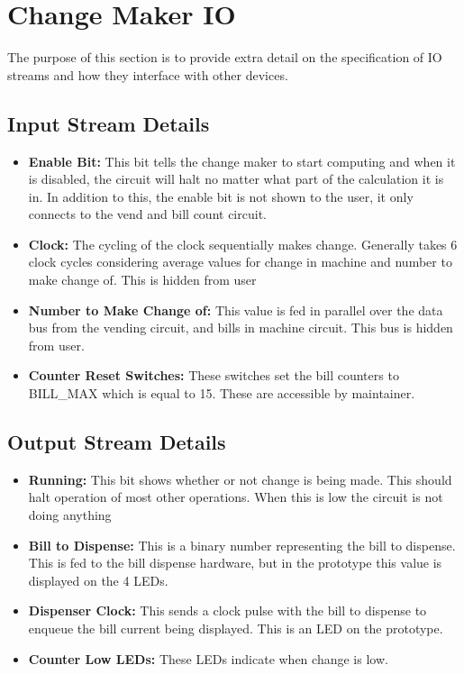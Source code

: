 \section{Change Maker IO}
The purpose of this section is to provide extra detail on
the specification of IO streams and how they interface
with other devices. 

\subsection{Input Stream Details}
\begin{itemize}
\item{\textbf{Enable Bit:} This bit tells the change maker to start computing
and when it is disabled, the circuit will halt no matter what part of
the calculation it is in. In addition to this, the enable bit is not
shown to the user, it only connects to the vend and bill count circuit.}
\item{\textbf{Clock:} The cycling of the clock sequentially makes change. 
Generally takes 6 clock cycles considering average values for change in 
machine and number to make change of. This is hidden from user}
\item{\textbf{Number to Make Change of:} This value is fed in parallel over the
data bus from the vending circuit, and bills in machine circuit. This
bus is hidden from user.}
\item{\textbf{Counter Reset Switches:} These switches set the bill counters to
BILL\_MAX which is equal to 15. These are accessible by maintainer.}
\end{itemize}

\subsection{Output Stream Details}
\begin{itemize}
\item{\textbf{Running:} This bit shows whether or not change is being made.
This should halt operation of most other operations. When this is low the
circuit is not doing anything}
\item{\textbf{Bill to Dispense:} This is a binary number representing the
bill to dispense. This is fed to the bill dispense hardware, but in the
prototype this value is displayed on the 4 LEDs.}
\item{\textbf{Dispenser Clock:} This sends a clock pulse with the bill to
dispense to enqueue the bill current being displayed. This is an LED on
the prototype.}
\item{\textbf{Counter Low LEDs:} These LEDs indicate when change is low.} 
\end{itemize}
